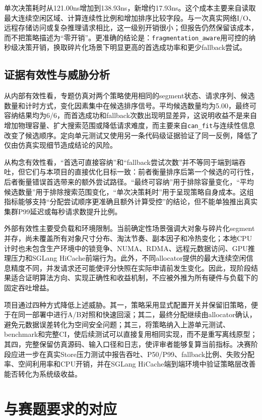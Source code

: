 \documentclass[UTF8,zihao=-4,a4paper]{ctexart}
\newcommand{\artifact}[1]{\texttt{#1}}
\newcommand{\strategy}{\texttt{fragmentation\_aware}}
\begin{document}
单次决策耗时从121.00ns增加到138.93ns，新增约17.93ns。这个成本主要来自读取最大连续空闲区域、计算连续性比例和增加排序比较字段。与一次真实网络I/O、远程存储访问或复杂推理请求相比，这一级别开销很小；但报告仍然保留该成本，而不把策略描述为“零开销”。更准确的结论是：\strategy{}用可控的纳秒级决策开销，换取碎片化场景下明显更高的首选成功率和更少fallback尝试。

\subsection{证据有效性与威胁分析}

从内部有效性看，专题仿真对两个策略使用相同的segment状态、请求序列、候选数量和计时方式，变化因素集中在候选排序信号。平均候选数量均为5.00，最终可容纳结果均为6/6，而首选成功和fallback次数出现明显差异，这说明收益不是来自增加物理容量、扩大搜索范围或降低请求难度，而主要来自\artifact{can\_fit}与连续性信息改变了候选顺序。定向单元测试又使用另一条代码级证据验证了同一反例，降低了仅由仿真实现细节造成结论的风险。

从构念有效性看，“首选可直接容纳”和“fallback尝试次数”并不等同于端到端吞吐，但它们与本项目的直接优化目标一致：前者衡量排序后第一个候选的可行性，后者衡量错误首选带来的额外尝试路径。“最终可容纳”用于排除容量变化，“平均候选数量”用于排除搜索范围变化，“单次决策耗时”用于呈现策略自身成本。这组指标能够支持“分配尝试顺序更准确且额外计算受控”的结论，但不能单独推出真实集群P99延迟或每秒请求数提升比例。

外部有效性主要受负载和环境限制。当前确定性场景强调大对象与碎片化segment并存，尚未覆盖所有对象尺寸分布、淘汰节奏、副本因子和冷热变化；本地CPU计时也未包含生产环境中的锁竞争、NUMA、RDMA、远程元数据访问、GPU推理压力和SGLang HiCache前端行为。此外，不同allocator提供的最大连续空闲信息精度不同，并发请求还可能使评分快照在实际申请前发生变化。因此，现阶段结果适合证明算法方向、实现正确性和收益机制，不应被外推为所有硬件与负载下的固定吞吐增益。

项目通过四种方式降低上述威胁。其一，策略采用显式配置开关并保留旧策略，便于在同一部署中进行A/B对照和快速回滚；其二，最终分配继续由allocator确认，避免元数据误差转化为空间安全问题；其三，将策略纳入上游单元测试、benchmark和完整CI，使后续测试可以直接复用相同实现，而不是重写离线原型；其四，完整保留仿真源码、输入口径和日志，使评审者能够复算当前指标。决赛阶段应进一步在真实Store压力测试中报告吞吐、P50/P99、fallback比例、失败分配率、空间利用率和CPU开销，并在SGLang HiCache端到端环境中验证策略层改善能否转化为系统级收益。

\section{与赛题要求的对应}
\end{document}
